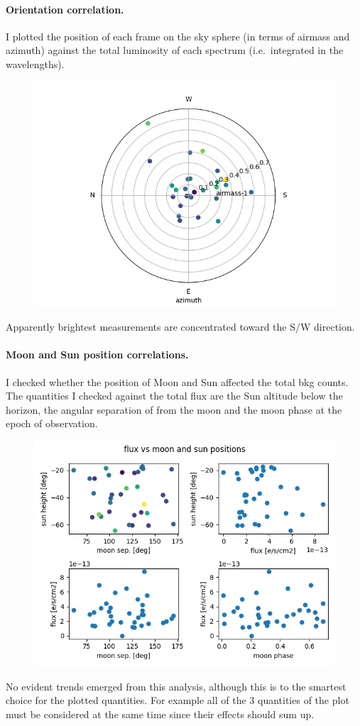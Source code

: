 \documentclass{article}
\begin{document}
\paragraph{Orientation correlation.} I plotted the position of each frame on the sky sphere (in terms of airmass and azimuth) against the total luminosity of each spectrum (i.e.\ integrated in the wavelengths).
\begin{figure}[h!]
	\centering
	\includegraphics[width=.75\textwidth]{../radial}
\end{figure}
Apparently brightest measurements are concentrated toward the S/W direction.

\paragraph{Moon and Sun position correlations.}
I checked whether the position of Moon and Sun affected the total bkg counts. The quantities I checked against the total flux are the Sun altitude below the horizon, the angular separation of from the moon and the moon phase at the epoch of observation.
	\begin{figure}[h!]
	\centering
	\includegraphics[width=.75\textwidth]{../positions}
\end{figure}
No evident trends emerged from this analysis, although this is to the smartest choice for the plotted quantities. For example all of the 3 quantities of the plot must be considered at the same time since their effects should sum up.
\end{document}
